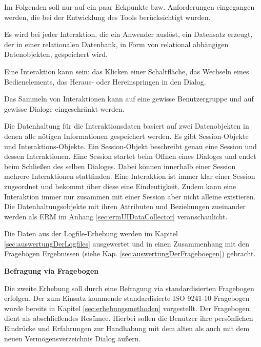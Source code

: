 Im Folgenden soll nur auf ein paar Eckpunkte bzw. Anforderungen eingegangen werden, die bei der Entwicklung des Tools berücksichtigt wurden.
\begin{compactitem}
   \item Es wird bei jeder Interaktion, die ein Anwender auslöst, ein Datensatz erzeugt, der in einer relationalen Datenbank, in Form von relational abhängigen Datenobjekten, gespeichert wird.
   \item Eine Interaktion kann sein: das Klicken einer Schaltfläche, das Wechseln eines Bedienelements, das Heraus- oder Hereinspringen in den Dialog.
   \item Das Sammeln von Interaktionen kann auf eine gewisse Benutzergruppe und auf gewisse Dialoge eingeschränkt werden.
\end{compactitem}

Die Datenhaltung für die Interaktionsdaten basiert auf zwei Datenobjekten in denen alle nötigen Informationen gespeichert werden. Es gibt Session-Objekte und Interaktions-Objekte. Ein Session-Objekt beschreibt genau eine Session und dessen Interaktionen. Eine Session startet beim Öffnen eines Dialoges und endet beim Schließen des selben Dialoges. Dabei können innerhalb einer Session mehrere Interaktionen stattfinden. Eine Interaktion ist immer klar einer Session zugeordnet und bekommt über diese eine Eindeutigkeit. Zudem kann eine Interaktion immer nur zusammen mit einer Session aber nicht alleine existieren. Die Datenhaltungsobjekte mit ihren Attributen und Beziehungen zueinander werden als \gls{ERM} im Anhang \ref{sec:ermUIDataCollector} veranschaulicht.

Die Daten aus der Logfile-Erhebung werden im Kapitel \ref{sec:auswertungDerLogfiles} ausgewertet und in einen Zusammenhang mit den Fragebögen Ergebnissen (siehe Kap. \ref{sec:auswertungDerFrageboegen}) gebracht.

\textbf{Befragung via Fragebogen}

Die zweite Erhebung soll durch eine Befragung via standardisierten Fragebogen erfolgen. Der zum Einsatz kommende standardisierte ISO 9241-10 Fragebogen wurde bereits in Kapitel \ref{sec:erhebungsmethoden} vorgestellt. Der Fragebogen dient als abschließendes Resümee. Hierbei sollen die Benutzer ihre persönlichen Eindrücke und Erfahrungen zur Handhabung mit dem alten als auch mit dem neuen Vermögensverzeichnis Dialog äußern.


